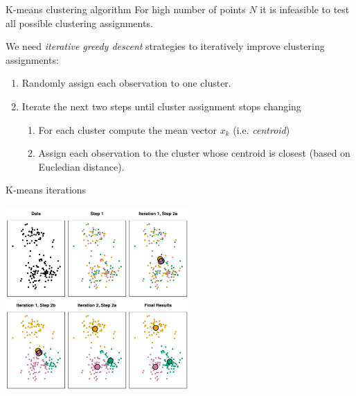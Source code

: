 \documentclass[notes]{beamer}          %
\begin{document}
\begin{frame}{K-means clustering algorithm}
For high number of points $N$ it is infeasible to test all possible clustering assignments.

\vspace{2mm} 

We need \textit{iterative greedy descent} strategies to iteratively improve clustering assignments: 

\begin{enumerate}
 \item Randomly assign each observation to one cluster.
 \item Iterate the next two steps until cluster assignment stops changing
 \begin{enumerate}
 	\item For each cluster compute the mean vector $x_k$ (i.e. \textit{centroid})
 	\item Assign each observation to the cluster whose centroid is closest (based on Eucledian distance).
 \end{enumerate}
\end{enumerate}

\end{frame}

\begin{frame}{K-means iterations}
\begin{center}
\includegraphics[height=7cm]{../figures/week_6/K-means_iterations.pdf}  
\end{center}
\end{frame}
\end{document}
